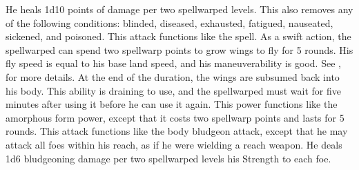 He heals 1d10 points of damage per two spellwarped levels.
This also removes any of the following conditions: blinded, diseased, exhausted, fatigued, nauseated, sickened, and poisoned.
 This attack functions like the 
spell.
As a swift action, the spellwarped can spend two spellwarp points to grow wings to fly for 5 rounds.
His fly speed is equal to his base land speed, and his maneuverability is good.
See , for more details.
At the end of the duration, the wings are subsumed back into his body.
This ability is draining to use, and the spellwarped must wait for five minutes after using it before he can use it again.
This power functions like the amorphous form power, except that it costs two spellwarp points and lasts for 5 rounds.
This attack functions like the body bludgeon attack, except that he may attack all foes within his reach, as if he were wielding a reach weapon.
He deals 1d6 bludgeoning damage per two spellwarped levels \add his Strength to each foe.

